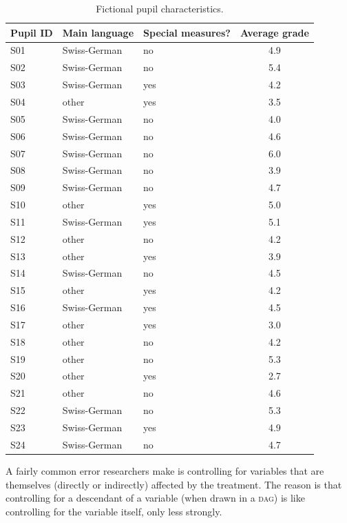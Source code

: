 \documentclass[a4paper]{tufte-book}\usepackage[]{graphicx}\usepackage[]{xcolor}
\begin{document}
\begin{table}[tbp]
\centering
\caption{Fictional pupil characteristics.}
\label{tab:pupils}
\begin{tabular}{@{}lllc@{}}
\toprule
 Pupil ID       & Main language   & Special measures?    & Average grade     \\
 \midrule
 S01            & Swiss-German & no  & 4.9 \\
 S02            & Swiss-German & no  & 5.4 \\
 S03            & Swiss-German & yes & 4.2 \\
 S04            & other        & yes & 3.5 \\
 S05            & Swiss-German & no  & 4.0 \\
 S06            & Swiss-German & no  & 4.6 \\
 S07            & Swiss-German & no  & 6.0 \\
 S08            & Swiss-German & no  & 3.9 \\
 S09            & Swiss-German & no  & 4.7 \\
 S10            & other        & yes & 5.0 \\
 S11            & Swiss-German & yes & 5.1 \\
 S12            & other        & no  & 4.2 \\
 S13            & other        & yes & 3.9 \\
 S14            & Swiss-German & no  & 4.5 \\
 S15            & other        & yes & 4.2 \\
 S16            & Swiss-German & yes & 4.5 \\
 S17            & other        & yes & 3.0 \\
 S18            & other        & no  & 4.2 \\
 S19            & other        & no  & 5.3 \\
 S20            & other        & yes & 2.7 \\
 S21            & other        & no  & 4.6 \\
 S22            & Swiss-German & no  & 5.3 \\
 S23            & Swiss-German & yes & 4.9 \\
 S24            & Swiss-German & no  & 4.7 \\
 \bottomrule
\end{tabular}
\end{table}


\label{par:posttreatment}
A fairly common error researchers make is controlling for variables that are themselves
(directly or indirectly) affected by the treatment. The reason is that
controlling for a descendant of a variable (when drawn in a \textsc{dag}) 
is like controlling for the variable itself, only less strongly.
\end{document}
